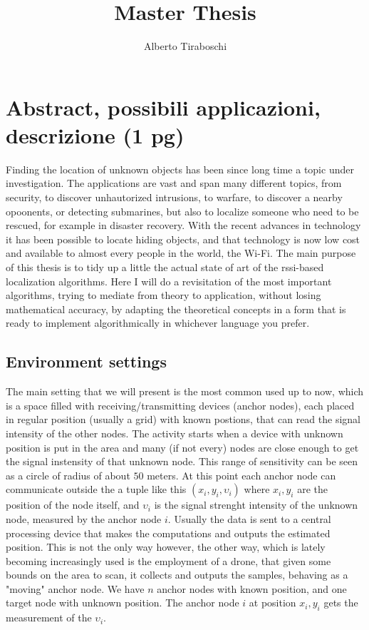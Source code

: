 \documentclass[12pt,twoside]{report}
\title{Master Thesis}
\author{Alberto Tiraboschi}
\begin{document}

\maketitle
\clearpage
\thispagestyle{empty}
\tableofcontents
\thispagestyle{empty}
\clearpage

\setcounter{page}{1}

\chapter{Abstract, possibili applicazioni, descrizione (1 pg)}
Finding the location of unknown objects has been since long time a topic under investigation. The applications are vast and span many different topics, from security, to discover unhautorized intrusions, to warfare, to discover a nearby opoonents, or detecting submarines, but also to localize someone who need to be rescued, for example in disaster recovery. With the recent advances in technology it has been possible to locate hiding objects, and that technology is now low cost and available to almost every people in the world, the Wi-Fi. The main purpose of this thesis is to tidy up a little the actual state of art of the rssi-based localization algorithms. Here I will do a revisitation of the most important algorithms, trying to mediate from theory to application, without losing mathematical accuracy, by adapting the theoretical concepts in a form that is ready to implement algorithmically in whichever language you prefer.

\section{Environment settings}
The main setting that we will present is the most common used up to now, which is a space filled with receiving/transmitting devices (anchor nodes), each placed in regular position (usually a grid) with known postions, that can read the signal intensity of the other nodes. The activity starts when a device with unknown position is put in the area and many (if not every) nodes are close enough to get the signal instensity of that unknown node. This range of sensitivity can be seen as a circle of radius of about $50$ meters. At this point each anchor node can communicate outside the a tuple like this $(x_i,y_i,\upsilon_i)$ where $x_i,y_i$ are the position of the node itself, and $\upsilon_i$ is the signal strenght intensity of the unknown node, measured by the anchor node $i$. Usually the data is sent to a central processing device that makes the computations and outputs the estimated position. This is not the only way however, the other way, which is lately becoming increasingly used is the employment of a drone, that given some bounds on the area to scan, it collects and outputs the samples, behaving as a "moving" anchor node. We have $n$ anchor nodes with known position, and one target node with unknown position. The anchor node $i$ at position $x_i,y_i$ gets the measurement of the $\upsilon_i$. 
\end{document}
